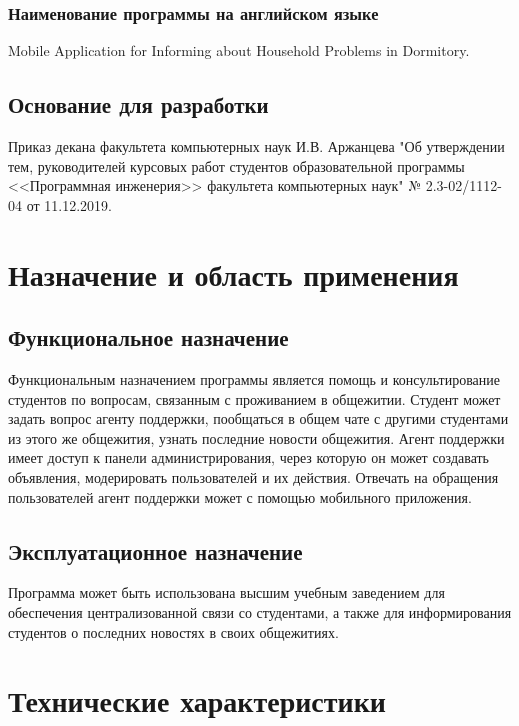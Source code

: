 \documentclass{../includes/TechDoc}
\begin{document}
    \subsubsection{Наименование программы на английском языке}

    Mobile Application for Informing about Household Problems in Dormitory.

    \subsection{Основание для разработки}

    Приказ декана факультета компьютерных наук И.В. Аржанцева "Об утверждении тем, руководителей курсовых работ студентов образовательной программы <<Программная инженерия>> факультета компьютерных наук" № 2.3-02/1112-04 от 11.12.2019.


    \section{Назначение и область применения}

    \subsection{Функциональное назначение}

    Функциональным назначением программы является помощь и консультирование студентов по вопросам, связанным
    с проживанием в общежитии. Студент может задать вопрос агенту поддержки, пообщаться в общем чате с другими
    студентами из этого же общежития, узнать последние новости общежития. Агент поддержки имеет доступ к панели
    администрирования, через которую он может создавать объявления, модерировать пользователей и их действия. Отвечать
    на обращения пользователей агент поддержки может с помощью мобильного приложения.

    \subsection{Эксплуатационное назначение}

    Программа может быть использована высшим учебным заведением для обеспечения централизованной связи со студентами, а
    также для информирования студентов о последних новостях в своих общежитиях.


    \section{Технические характеристики}
\end{document}
